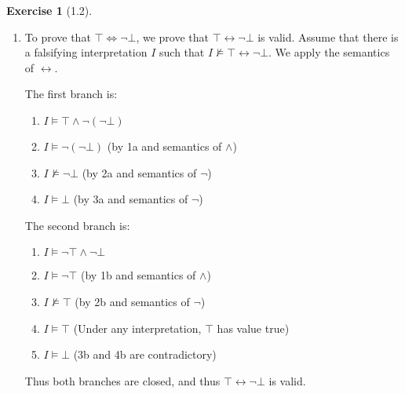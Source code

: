 \documentclass[12pt, psamsfonts]{amsart}
\theoremstyle{definition}
\newtheorem*{exer}{Exercise}
\theoremstyle{remark}
\numberwithin{equation}{subsection}
\begin{document}
\begin{exer}[1.2]
    $ $
    \begin{enumerate}[label=(\alph*)]
        \item
            To prove that $\top \Leftrightarrow \neg \bot$, we prove that $\top \leftrightarrow \neg \bot$ is valid.
            Assume that there is a falsifying interpretation $I$ such that $I \not\models \top \leftrightarrow \neg \bot$.
            We apply the semantics of $\leftrightarrow$.

            The first branch is:
            \begin{enumerate}[label=\arabic*a.]
                \item %
                    $I \models \top \land \neg(\neg \bot)$ 
                \item %
                    $I \models \neg(\neg \bot)$ (by 1a and semantics of $\land$)
                \item %
                    $I \not\models \neg \bot$ (by 2a and semantics of $\neg$)
                \item %
                    $I \models \bot$ (by 3a and semantics of $\neg$)
            \end{enumerate}

            The second branch is:
            \begin{enumerate}[label=\arabic*b.]
                \item %
                    $I \models \neg \top \land \neg \bot$ 
                \item %
                    $I \models \neg \top$ (by 1b and semantics of $\land$)
                \item %
                    $I \not\models \top$ (by 2b and semantics of $\neg$)
                \item %
                    $I \models \top$ (Under any interpretation, $\top$ has value true)
                \item %
                    $I \models \bot$ (3b and 4b are contradictory)
            \end{enumerate}
            Thus both branches are closed, and thus $\top \leftrightarrow \neg \bot$ is valid.
    \end{enumerate}
\end{exer}
\end{document}
